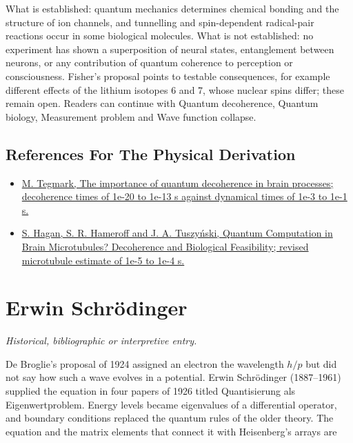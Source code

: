 \documentclass[11pt,oneside]{book}
\begin{document}
What is established: quantum mechanics determines chemical bonding and the structure of ion channels, and tunnelling and spin-dependent radical-pair reactions occur in some biological molecules. What is not established: no experiment has shown a superposition of neural states, entanglement between neurons, or any contribution of quantum coherence to perception or consciousness. Fisher's proposal points to testable consequences, for example different effects of the lithium isotopes 6 and 7, whose nuclear spins differ; these remain open. Readers can continue with Quantum decoherence, Quantum biology, Measurement problem and Wave function collapse.

\subsection*{References For The Physical Derivation}
\begin{itemize}
\item \href{https://arxiv.org/abs/quant-ph/9907009}{M. Tegmark, The importance of quantum decoherence in brain processes; decoherence times of 1e-20 to 1e-13 s against dynamical times of 1e-3 to 1e-1 s.}
\item \href{https://arxiv.org/abs/quant-ph/0005025}{S. Hagan, S. R. Hameroff and J. A. Tuszyński, Quantum Computation in Brain Microtubules? Decoherence and Biological Feasibility; revised microtubule estimate of 1e-5 to 1e-4 s.}
\end{itemize}





\clearpage

\section{Erwin Schrödinger}

\label{topic:erwin-schr-dinger}

\par\smallskip\noindent\textit{Historical, bibliographic or interpretive entry.}

De Broglie's proposal of 1924 assigned an electron the wavelength \(h/p\) but did not say how such a wave evolves in a potential. Erwin Schrödinger (1887--1961) supplied the equation in four papers of 1926 titled Quantisierung als Eigenwertproblem. Energy levels became eigenvalues of a differential operator, and boundary conditions replaced the quantum rules of the older theory. The equation and the matrix elements that connect it with Heisenberg's arrays are
\end{document}

